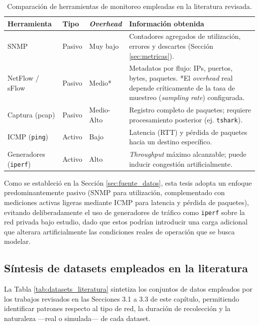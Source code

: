 \documentclass[12pt]{report}
\begin{document}
\begin{table}[H]
    \centering
    \begin{tabular}{|l|l|l|p{6cm}|}
        \hline
        \textbf{Herramienta} & \textbf{Tipo} & \textbf{\textit{Overhead}} & \textbf{Información obtenida} \\
        \hline
        SNMP & Pasivo & Muy bajo & Contadores agregados de utilización, errores y descartes (Sección \ref{sec:metricas}). \\
        \hline
        NetFlow / sFlow & Pasivo & Medio* & Metadatos por flujo: IPs, puertos, bytes, paquetes. *El \textit{overhead} real depende críticamente de la tasa de muestreo (\textit{sampling rate}) configurada. \\
        \hline
        Captura (pcap) & Pasivo & Medio-Alto & Registro completo de paquetes; requiere procesamiento posterior (ej. \texttt{tshark}). \\
        \hline
        ICMP (\texttt{ping}) & Activo & Bajo & Latencia (RTT) y pérdida de paquetes hacia un destino específico. \\
        \hline
        Generadores (\texttt{iperf}) & Activo & Alto & \textit{Throughput} máximo alcanzable; puede inducir congestión artificialmente. \\
        \hline
    \end{tabular}
    \caption{Comparación de herramientas de monitoreo empleadas en la literatura revisada.}
    \label{tab:herramientas_monitoreo}
\end{table}

Como se estableció en la Sección \ref{sec:fuente_datos}, esta tesis adopta un enfoque predominantemente pasivo (SNMP para utilización, complementado con mediciones activas ligeras mediante ICMP para latencia y pérdida de paquetes), evitando deliberadamente el uso de generadores de tráfico como \texttt{iperf} sobre la red privada bajo estudio, dado que estos podrían introducir una carga adicional que alterara artificialmente las condiciones reales de 
operación que se busca modelar.

\subsection*{Síntesis de datasets empleados en la literatura}

La Tabla \ref{tab:datasets_literatura} sintetiza los conjuntos de datos empleados por los trabajos revisados en las Secciones 3.1 a 3.3 de este capítulo, permitiendo identificar patrones respecto al tipo de red, la duración de recolección y la naturaleza —real o simulada— de cada dataset.
\end{document}
